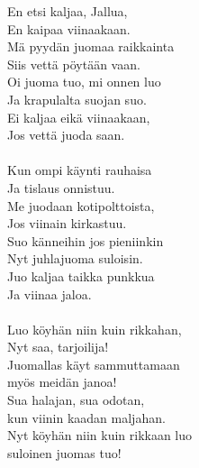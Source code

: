 
            En etsi kaljaa, Jallua, \\
            En kaipaa viinaakaan. \\
            Mä pyydän juomaa raikkainta \\
            Siis vettä pöytään vaan. \\
            Oi juoma tuo, mi onnen luo \\
            Ja krapulalta suojan suo. \\
            Ei kaljaa eikä viinaakaan, \\
            Jos vettä juoda saan. \\
\hspace{10mm} \\
            Kun ompi käynti rauhaisa \\
            Ja tislaus onnistuu. \\
            Me juodaan kotipolttoista, \\
            Jos viinain kirkastuu. \\
            Suo känneihin jos pieniinkin \\
            Nyt juhlajuoma suloisin. \\
            Juo kaljaa taikka punkkua \\
            Ja viinaa jaloa. \\
\hspace{10mm} \\
            Luo köyhän niin kuin rikkahan, \\
            Nyt saa, tarjoilija! \\
            Juomallas käyt sammuttamaan \\
            myös meidän janoa! \\
            Sua halajan, sua odotan, \\
            kun viinin kaadan maljahan. \\
            Nyt köyhän niin kuin rikkaan luo \\
            suloinen juomas tuo! \\
